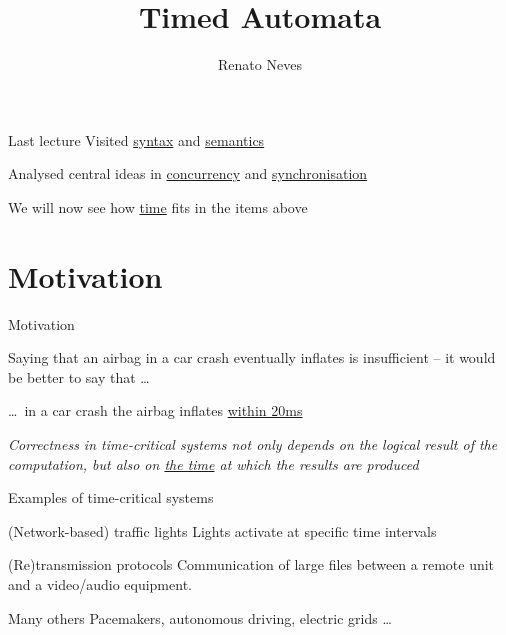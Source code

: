 \documentclass{beamer}
\author[Renato Neves]{Renato Neves}
\date{}
\begin{document}
\title{Timed Automata}

\frame[plain]{\titlepage}

\begin{frame}{Last lecture}
  Visited \alert{\underline{syntax}} and \alert{\underline{semantics}}

  Analysed central ideas in \alert{\underline{concurrency}} and
  \alert{\underline{synchronisation}}

  \pause
  \vfill
  We will now see how \alert{\underline{time}} fits in the items above
\end{frame}
\section{Motivation}
\begin{slide}{Motivation}


Saying that an airbag in a car crash \alert{eventually
inflates} is insufficient -- it would be better to say that \dots
\begin{center}
\dots\ in a car crash the airbag inflates \alert{\underline{within 20ms}}
\end{center}
 
\vfill
\emph{Correctness in time-critical systems not only depends on
      the logical result of the computation, but also \alert{on \underline{the time}
      at which the results are produced}}
\begin{flushright}
\end{flushright}
\end{slide}

\begin{slide}{Examples of time-critical systems}

\begin{block}{(Network-based) traffic lights}
  Lights activate at specific time intervals
\end{block}

\smallskip
\begin{block}{(Re)transmission  protocols}
  Communication of large files between a remote unit and a video/audio
  equipment. 
\end{block}

\smallskip
\begin{block}{Many others}
Pacemakers, autonomous driving, electric grids
\dots
\end{block}
\end{slide}
\end{document}
